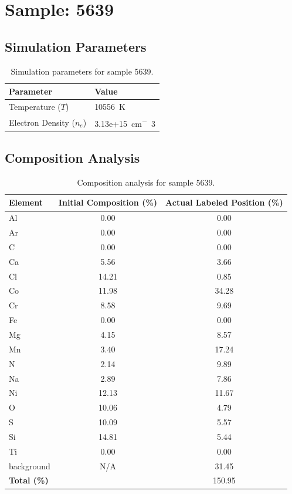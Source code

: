 \documentclass[a4paper,11pt]{article}
\begin{document}
\clearpage

\section{Sample: 5639}
\subsection{Simulation Parameters}
\begin{table}[h!]
    \centering
    \begin{tabular}{ll}
        \toprule
        \textbf{Parameter} & \textbf{Value} \\
        \midrule
        Temperature ($T$) & 10556 \,\si{K} \\
        Electron Density ($n_e$) & 3.13e+15 \,\si{cm^-3} \\
        \bottomrule
    \end{tabular}
    \caption{Simulation parameters for sample 5639.}
    \label{tab:params_5639}
\end{table}

\subsection{Composition Analysis}
\begin{table}[h!]
    \centering
    \begin{tabular}{lcc}
        \toprule
        \textbf{Element} & \textbf{Initial Composition (\%)} & \textbf{Actual Labeled Position (\%)} \\
        \midrule
        Al & 0.00 & 0.00 \\
        Ar & 0.00 & 0.00 \\
        C & 0.00 & 0.00 \\
        Ca & 5.56 & 3.66 \\
        Cl & 14.21 & 0.85 \\
        Co & 11.98 & 34.28 \\
        Cr & 8.58 & 9.69 \\
        Fe & 0.00 & 0.00 \\
        Mg & 4.15 & 8.57 \\
        Mn & 3.40 & 17.24 \\
        N & 2.14 & 9.89 \\
        Na & 2.89 & 7.86 \\
        Ni & 12.13 & 11.67 \\
        O & 10.06 & 4.79 \\
        S & 10.09 & 5.57 \\
        Si & 14.81 & 5.44 \\
        Ti & 0.00 & 0.00 \\
        background & N/A & 31.45 \\

        \midrule
        \textbf{Total (\%)} & & 150.95 \\
        \bottomrule
    \end{tabular}
    \caption{Composition analysis for sample 5639.}
    \label{tab:comp_5639}
\end{table}
\end{document}
